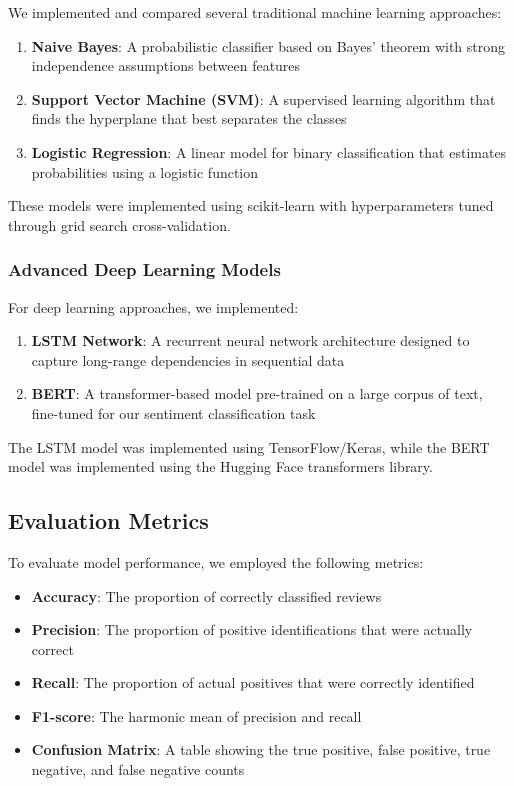 \documentclass[
]{article}
\providecommand{\tightlist}{%
  \setlength{\itemsep}{0pt}\setlength{\parskip}{0pt}}\usepackage{longtable,booktabs,array}
\begin{document}
We implemented and compared several traditional machine learning
approaches:

\begin{enumerate}
\def\labelenumi{\arabic{enumi}.}
\item
  \textbf{Naive Bayes}: A probabilistic classifier based on Bayes'
  theorem with strong independence assumptions between features
\item
  \textbf{Support Vector Machine (SVM)}: A supervised learning algorithm
  that finds the hyperplane that best separates the classes
\item
  \textbf{Logistic Regression}: A linear model for binary classification
  that estimates probabilities using a logistic function
\end{enumerate}

These models were implemented using scikit-learn with hyperparameters
tuned through grid search cross-validation.

\subsubsection{Advanced Deep Learning
Models}\label{advanced-deep-learning-models}

For deep learning approaches, we implemented:

\begin{enumerate}
\def\labelenumi{\arabic{enumi}.}
\item
  \textbf{LSTM Network}: A recurrent neural network architecture
  designed to capture long-range dependencies in sequential data
\item
  \textbf{BERT}: A transformer-based model pre-trained on a large corpus
  of text, fine-tuned for our sentiment classification task
\end{enumerate}

The LSTM model was implemented using TensorFlow/Keras, while the BERT
model was implemented using the Hugging Face transformers library.

\subsection{Evaluation Metrics}\label{evaluation-metrics}

To evaluate model performance, we employed the following metrics:

\begin{itemize}
\tightlist
\item
  \textbf{Accuracy}: The proportion of correctly classified reviews
\item
  \textbf{Precision}: The proportion of positive identifications that
  were actually correct
\item
  \textbf{Recall}: The proportion of actual positives that were
  correctly identified
\item
  \textbf{F1-score}: The harmonic mean of precision and recall
\item
  \textbf{Confusion Matrix}: A table showing the true positive, false
  positive, true negative, and false negative counts
\end{itemize}
\end{document}
